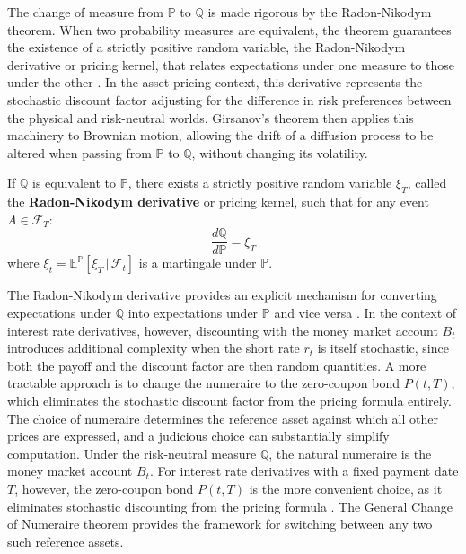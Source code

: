     \noindent
    The change of measure from $\mathbb{P}$ to $\mathbb{Q}$ is made rigorous by the Radon-Nikodym theorem. When two probability measures are equivalent, the theorem guarantees the existence of a strictly positive random variable, the Radon-Nikodym derivative or pricing kernel, that relates expectations under one measure to those under the other \cite{shreve2004stochastic}. In the asset pricing context, this derivative represents the stochastic discount factor adjusting for the difference in risk preferences between the physical and risk-neutral worlds. Girsanov’s theorem then applies this machinery to Brownian motion, allowing the drift of a diffusion process to be altered when passing from $\mathbb{P}$ to $\mathbb{Q}$, without changing its volatility. \\

    \begin{theorem}\label{thm:RND}
        If $\mathbb{Q}$ is equivalent to $\mathbb{P}$, there exists a strictly positive random variable $\xi_T$, called the \textbf{Radon-Nikodym derivative} or pricing kernel, such that for any event $A \in \mathcal{F}_T$:
        \begin{equation}
            \frac{d\mathbb{Q}}{d\mathbb{P}} = \xi_T
        \end{equation}
        where $\xi_t = \mathbb{E}^{\mathbb{P}}\!\left[ \xi_T \,\big|\, \mathcal{F}_t \right]$ is a martingale under $\mathbb{P}$.
    \end{theorem}

    \noindent
    The Radon-Nikodym derivative provides an explicit mechanism for converting expectations under $\mathbb{Q}$ into expectations under $\mathbb{P}$ and vice versa \cite{brigo2001interest}. In the context of interest rate derivatives, however, discounting with the money market account $B_t$ introduces additional complexity when the short rate $r_t$ is itself stochastic, since both the payoff and the discount factor are then random quantities. A more tractable approach is to change the numeraire to the zero-coupon bond $P(t,T)$, which eliminates the stochastic discount factor from the pricing formula entirely.\\

    \noindent
    The choice of numeraire determines the reference asset against which all other prices are expressed, and a judicious choice can substantially simplify computation. Under the risk-neutral measure $\mathbb{Q}$, the natural numeraire is the money market account $B_t$. For interest rate derivatives with a fixed payment date $T$, however, the zero-coupon bond $P(t,T)$ is the more convenient choice, as it eliminates stochastic discounting from the pricing formula \cite{brigo2001interest}. The General Change of Numeraire theorem provides the framework for switching between any two such reference assets. \\

